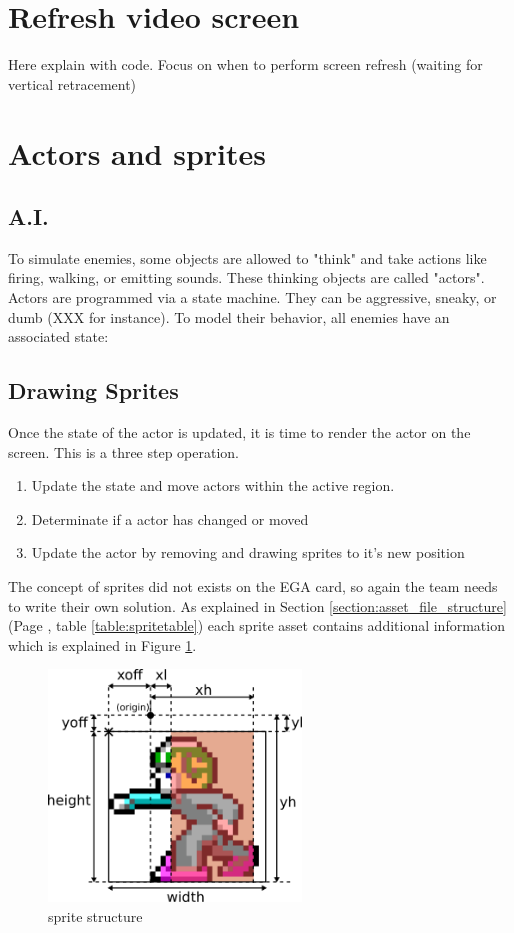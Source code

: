 \documentclass[book.tex]{subfiles}
\begin{document}
\section{Refresh video screen}
Here explain with code. Focus on when to perform screen refresh (waiting for vertical retracement)

\section{Actors and sprites}

\subsection{A.I.}
To simulate enemies, some objects are allowed to "think" and take actions like firing, walking,
or emitting sounds. These thinking objects are called "actors".
Actors are programmed via a state machine. They can be aggressive, sneaky, or dumb
(XXX for instance). To model their behavior, all enemies have an associated state:

\subsection{Drawing Sprites}
\label{section:draw_sprites}
Once the state of the actor is updated, it is time to render the actor on the screen. This is a three step operation.
\begin{enumerate}
\item Update the state and move actors within the active region.
\item Determinate if a actor has changed or moved
\item Update the actor by removing and drawing sprites to it's new position
\end{enumerate}

The concept of sprites did not exists on the EGA card, so again the team needs to write their own solution. As explained in Section \ref{section:asset_file_structure} (Page \pageref{table:spritetable}, table \ref{table:spritetable}) each sprite asset contains additional information which is explained in Figure \ref{fig:sprite_structure}.\\
\begin{figure}[H]
  \centering
  \includegraphics[width=0.6\textwidth]{imgs/drawings/sprite.png}
  \caption{sprite structure}
  \label{fig:sprite_structure}
\end{figure}
\end{document}
